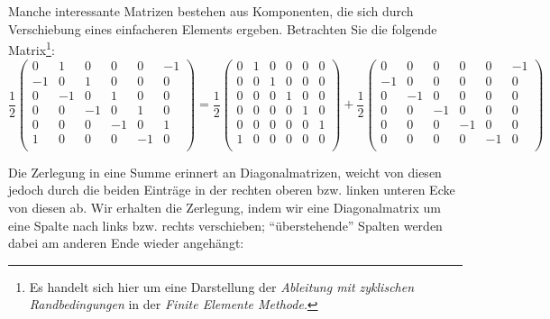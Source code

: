 Manche interessante Matrizen bestehen aus Komponenten, die sich durch Verschiebung eines einfacheren Elements ergeben. Betrachten Sie die folgende Matrix\footnote{Es handelt sich hier um eine Darstellung der \emph{Ableitung mit zyklischen Randbedingungen} in der \emph{Finite Elemente Methode}.}:
\[
\frac{1}{2}
\begin{pmatrix}
	 0 &  1 &  0 &  0 &  0 & -1 \\
	-1 &  0 &  1 &  0 &  0 &  0 \\
   0 & -1 &  0 &  1 &  0 &  0 \\
   0 &  0 & -1 &  0 &  1 &  0 \\
   0 &  0 &  0 & -1 &  0 &  1 \\
   1 &  0 &  0 &  0 & -1 &  0 \\
\end{pmatrix} 
=
\frac{1}{2}
\begin{pmatrix}
	 0 &  1 &  0 &  0 &  0 &  0 \\
	 0 &  0 &  1 &  0 &  0 &  0 \\
   0 &  0 &  0 &  1 &  0 &  0 \\
   0 &  0 &  0 &  0 &  1 &  0 \\
   0 &  0 &  0 &  0 &  0 &  1 \\
   1 &  0 &  0 &  0 &  0 &  0 \\
\end{pmatrix}
+
\frac{1}{2}
\begin{pmatrix}
	 0 &  0 &  0 &  0 &  0 & -1 \\
	-1 &  0 &  0 &  0 &  0 &  0 \\
   0 & -1 &  0 &  0 &  0 &  0 \\
   0 &  0 & -1 &  0 &  0 &  0 \\
   0 &  0 &  0 & -1 &  0 &  0 \\
   0 &  0 &  0 &  0 & -1 &  0 \\
\end{pmatrix}
\]

Die Zerlegung in eine Summe erinnert an Diagonalmatrizen, weicht von diesen jedoch durch die beiden Einträge in der rechten oberen bzw. linken unteren Ecke von diesen ab. Wir erhalten die Zerlegung, indem wir eine Diagonalmatrix um eine Spalte nach links bzw. rechts verschieben; \enquote{überstehende} Spalten werden dabei am anderen Ende wieder angehängt:

